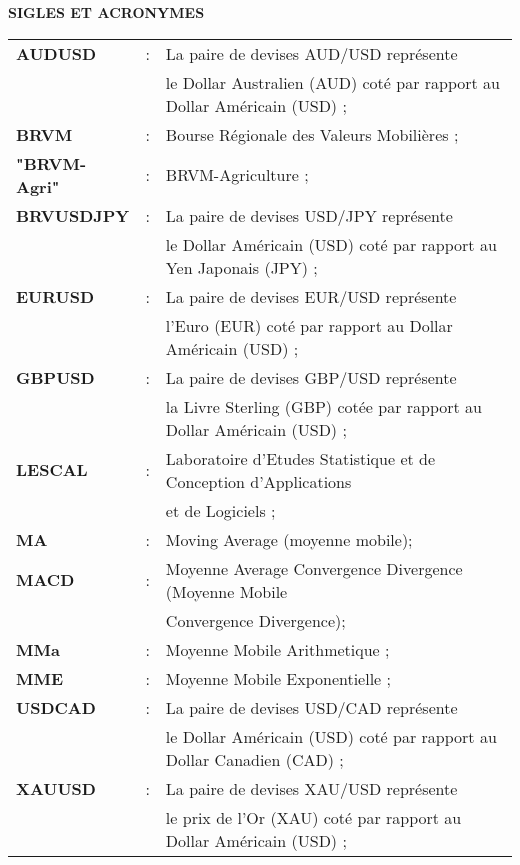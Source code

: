 	\begin{center}
		\LARGE \textbf{{SIGLES ET ACRONYMES}} 
	\end{center}

\begin{tabular}{lll}
	\textbf{AUDUSD}&:&La paire de devises AUD/USD représente \\ 
	& & le Dollar Australien (AUD) coté par rapport au Dollar Américain (USD) ;\\

	\textbf{BRVM}&:&Bourse Régionale des Valeurs Mobilières ;\\

	\textbf{"BRVM-Agri"}&:&BRVM-Agriculture ; \\

	\textbf{BRVUSDJPY}&:&La paire de devises USD/JPY représente \\ 
	& & le Dollar Américain (USD) coté par rapport au Yen Japonais (JPY) ; \\

	\textbf{EURUSD}&:&La paire de devises EUR/USD représente \\ 
	& & l'Euro (EUR) coté par rapport au Dollar Américain (USD) ; \\

	\textbf{GBPUSD}&:&La paire de devises GBP/USD représente \\ 
	& & la Livre Sterling (GBP) cotée par rapport au Dollar Américain (USD) ;\\

	\textbf{LESCAL} &:& Laboratoire d'Etudes Statistique et de Conception d'Applications \\ 
	& & et de Logiciels ; \\

	\textbf{MA} &:& Moving Average (moyenne mobile); \\

	\textbf{MACD}&:&Moyenne Average Convergence Divergence (Moyenne Mobile \\ 
	& &  Convergence Divergence); \\

	\textbf{MMa} &:& Moyenne Mobile Arithmetique ; \\

	\textbf{MME}&:&Moyenne Mobile Exponentielle ; \\

	\textbf{USDCAD}&:&La paire de devises USD/CAD représente \\ 
	& & le Dollar Américain (USD) coté par rapport au Dollar Canadien (CAD) ;\\

	\textbf{XAUUSD}&:&La paire de devises XAU/USD représente \\ 
	& & le prix de l'Or (XAU) coté par rapport au Dollar Américain (USD) ; \\

\end{tabular}